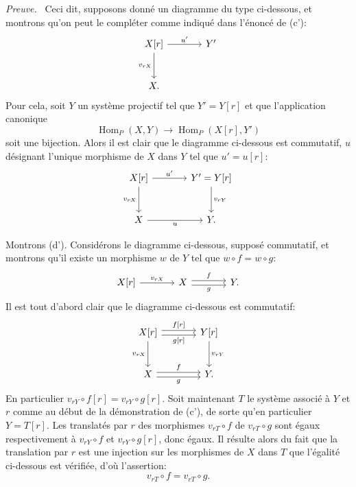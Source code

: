 \documentclass[11pt]{article}
\newenvironment{prooftext}[1][Proof]{\par\noindent\emph{#1.}\ }{\par\medskip}
\DeclareMathOperator{\Hom}{Hom}
\providecommand{\Hom}{\operatorname{Hom}}
\providecommand{\Hom}{\operatorname{Hom}}
\begin{document}
\begin{prooftext}[Preuve]
Ceci dit, supposons donné un diagramme du type ci-dessous, et montrons qu'on peut le compléter comme indiqué dans l'énoncé de (c'):
\[
\begin{tikzcd}[column sep=large,row sep=large]
X[r] \arrow[r,"u'"] \arrow[d,"{v_{rX}}"'] & Y'\\
X .
\end{tikzcd}
\]
Pour cela, soit $Y$ un système projectif tel que $Y'=Y[r]$ et que l'application canonique
\[
\Hom_P(X,Y)\longrightarrow\Hom_P(X[r],Y')
\]
soit une bijection. Alors il est clair que le diagramme ci-dessous est commutatif, $u$ désignant l'unique morphisme de $X$ dans $Y$ tel que $u'=u[r]$:
\[
\begin{tikzcd}[column sep=large,row sep=large]
X[r] \arrow[r,"u'"] \arrow[d,"{v_{rX}}"'] & Y'=Y[r] \arrow[d,"{v_{rY}}"]\\
X \arrow[r,"u"'] & Y .
\end{tikzcd}
\]

Montrons (d'). Considérons le diagramme ci-dessous, supposé commutatif, et montrons qu'il existe un morphisme $w$ de $Y$ tel que $w\circ f=w\circ g$:
\[
\begin{tikzcd}[column sep=large]
X[r] \arrow[r,"{v_{rX}}"] & X \arrow[r,shift left,"f"] \arrow[r,shift right,"g"'] & Y .
\end{tikzcd}
\]
Il est tout d'abord clair que le diagramme ci-dessous est commutatif:
\[
\begin{tikzcd}[column sep=large,row sep=large]
X[r] \arrow[r,shift left,"{f[r]}"] \arrow[r,shift right,"{g[r]}"'] \arrow[d,"{v_{rX}}"'] & Y[r] \arrow[d,"{v_{rY}}"]\\
X \arrow[r,shift left,"f"] \arrow[r,shift right,"g"'] & Y .
\end{tikzcd}
\]
En particulier $v_{rY}\circ f[r]=v_{rY}\circ g[r]$. Soit maintenant $T$ le système associé à $Y$ et $r$ comme au début de la démonstration de (c'), de sorte qu'en particulier $Y=T[r]$. Les translatés par $r$ des morphismes $v_{rT}\circ f$ de $v_{rT}\circ g$ sont égaux respectivement à $v_{rY}\circ f$ et $v_{rY}\circ g[r]$, donc égaux. Il résulte alors du fait que la translation par $r$ est une injection sur les morphismes de $X$ dans $T$ que l'égalité ci-dessous est vérifiée, d'où l'assertion:
\[
v_{rT}\circ f=v_{rT}\circ g.
\]
\end{prooftext}
\end{document}
